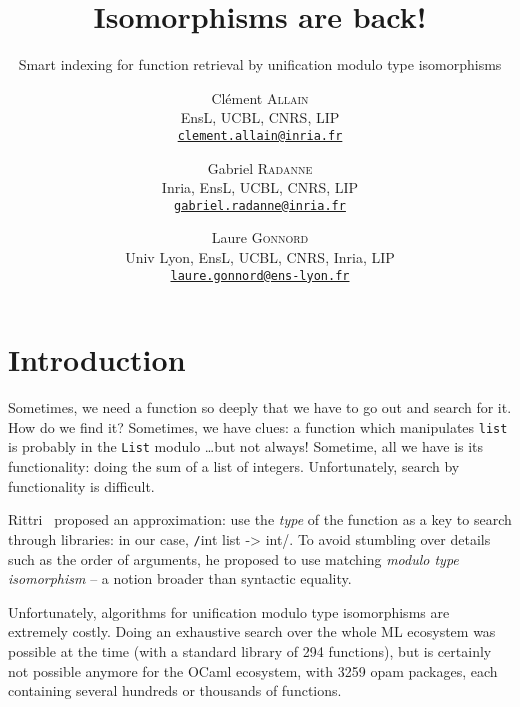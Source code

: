 \documentclass [a4paper,11pt]{scrartcl}
\title{Isomorphisms are back!}
\subtitle{Smart indexing for function retrieval by unification modulo type isomorphisms}
\author{
    Clément \textsc{Allain} \\
    EnsL, UCBL, CNRS, LIP \\
    \href{mailto:clement.allain@inria.fr}
   {\nolinkurl{clement.allain@inria.fr}}
  \and
  \and
    Gabriel \textsc{Radanne} \\
    Inria, EnsL, UCBL, CNRS, LIP \\
    \href{mailto:gabriel.radanne@inria.fr}
   {\nolinkurl{gabriel.radanne@inria.fr}}
  \and
    Laure \textsc{Gonnord} \\
    Univ Lyon, EnsL, UCBL, CNRS, Inria, LIP \\
    \href{mailto:laure.gonnord@ens-lyon.fr}
   {\nolinkurl{laure.gonnord@ens-lyon.fr}}
}
\date{}
\begin{document}
\maketitle







\section{Introduction}

Sometimes, we need a function so deeply that we have to go out and search for it.
How do we find it? Sometimes, we have clues: a function which manipulates \texttt{list} is probably
in the \texttt{List} modulo \dots but not always!
Sometime, all we have is its functionality: doing the sum of a list of integers.
Unfortunately, search by functionality is difficult.

Rittri~\cite{rittri} proposed an approximation: use the \emph{type} of the function as a key
to search through libraries: in our case, \texttt/int list -> int/.
To avoid stumbling over details such
as the order of arguments, he proposed to use matching \emph{modulo type isomorphism} --
a notion broader than syntactic equality.

Unfortunately, algorithms for unification modulo type isomorphisms are extremely
costly. Doing an exhaustive search over the whole ML ecosystem
was possible at the time (with a standard library of 294 functions),
but is certainly not possible anymore for the OCaml ecosystem,
with 3259 opam packages, each containing several hundreds or thousands of
functions.
\end{document}
